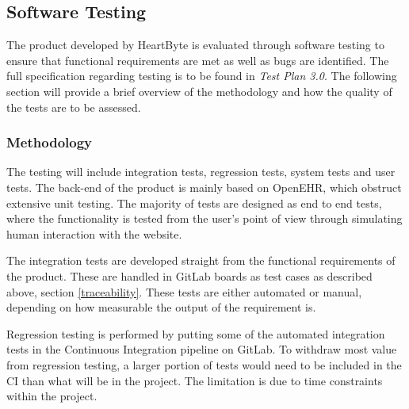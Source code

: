 \documentclass{article}
\begin{document}
	\subsection{Software Testing}
	The product developed by HeartByte is evaluated through software testing to ensure that functional requirements are met as well as bugs are identified. The full specification regarding testing is to be found in \textit{Test Plan 3.0}. The following section will provide a brief overview of the methodology and how the quality of the tests are to be assessed.
	

	\begin{comment}
		Dynamic testing - What TEsting team does
		Static testing - What I do
		Detect overcomplecity in code, find security errors (help source code be more secured when being deployed), enforce best coding practices (specific to code language, helps other understand code), can create project specific rules
		
		technical dept - translates as the implied cost for additional rework that can occur if at an early stage an easy but not efficient solution is chosen. In the future the easy code may restrict scalability. Might be measured by static testing tool
		
		sonarqube open source static analysis tools. 
		can detect tricky issues: bugs, code smells, security vulnerability,acticate rules needed (quality profiles),
	\end{comment}
	\subsubsection{Methodology}
	The testing will include integration tests, regression tests, system tests and user tests. The back-end of the product is mainly based on OpenEHR, which obstruct extensive unit testing. The majority of tests are designed as end to end tests, where the functionality is tested from the user's point of view through simulating human interaction with the website. 
	
	The integration tests are developed straight from the functional requirements of the product. These are handled in GitLab boards as test cases as described above, section \ref{traceability}. These tests are either automated or manual, depending on how measurable the output of the requirement is.
	
	Regression testing is performed by putting some of the automated integration tests in the Continuous Integration pipeline on GitLab. To withdraw most value from regression testing, a larger portion of tests would need to be included in the CI than what will be in the project. The limitation is due to time constraints within the project.
	
\end{document}
